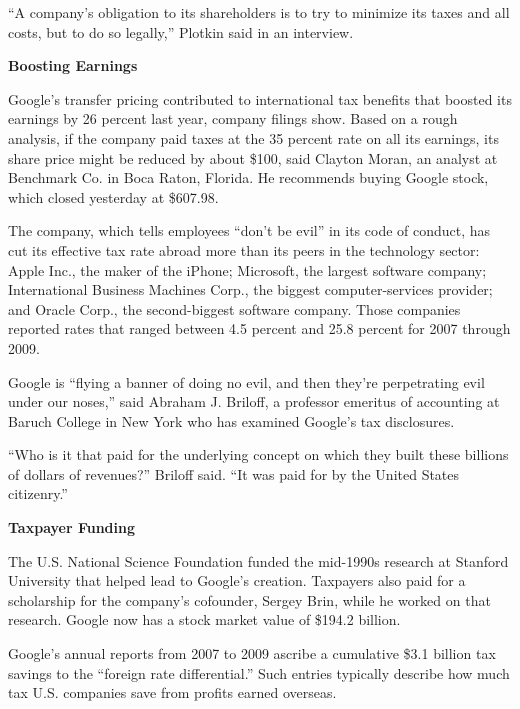 \begin{select}
``A company's obligation to its shareholders is to try to minimize its taxes and all costs, but to do so legally,'' Plotkin said in an interview.

\begin{center} \textbf{Boosting Earnings}
\end{center}

Google's transfer pricing contributed to international tax benefits that boosted its earnings by 26 percent last year, company filings show. Based on a rough analysis, if the company paid taxes at the 35 percent rate on all its earnings, its share price might be reduced by about \$100, said Clayton Moran, an analyst at Benchmark Co. in Boca Raton, Florida. He recommends buying Google stock, which closed yesterday at \$607.98.

The company, which tells employees ``don't be evil'' in its code of conduct, has cut its effective tax rate abroad more than its peers in the technology sector: Apple Inc., the maker of the iPhone; Microsoft, the largest software company; International Business Machines Corp., the biggest computer-services provider; and Oracle Corp., the second-biggest software company. Those companies reported rates that ranged between 4.5 percent and 25.8 percent for 2007 through 2009.

Google is ``flying a banner of doing no evil, and then they're perpetrating evil under our noses,'' said Abraham J. Briloff, a professor emeritus of accounting at Baruch College in New York who has examined Google's tax disclosures.

``Who is it that paid for the underlying concept on which they built these billions of dollars of revenues?'' Briloff said. ``It was paid for by the United States citizenry.''

\begin{center} \textbf{Taxpayer Funding}
\end{center}

The U.S. National Science Foundation funded the mid-1990s research at Stanford University that helped lead to Google's creation. Taxpayers also paid for a scholarship for the company's cofounder, Sergey Brin, while he worked on that research. Google now has a stock market value of \$194.2 billion.

Google's annual reports from 2007 to 2009 ascribe a cumulative \$3.1 billion tax savings to the ``foreign rate differential.'' Such entries typically describe how much tax U.S. companies save from profits earned overseas.


\end{select}
